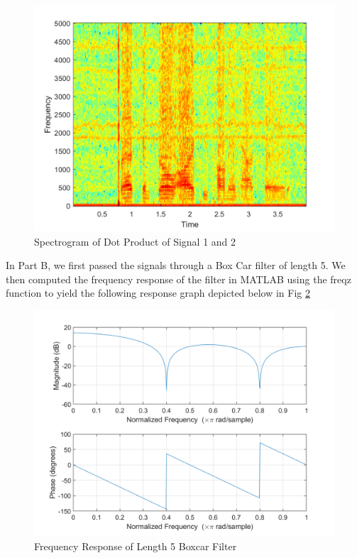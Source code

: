 \documentclass[10pt]{article}
\begin{document}
\begin{centering}
	\begin{figure} [H]
		\centering
		\includegraphics[scale=0.22]{images/multiplyspecgram.png}
		\caption{Spectrogram of Dot Product of Signal 1 and 2}
		\label{fig:multiply}
	\end{figure}
\end{centering}


In Part B, we first passed the signals through a Box Car filter of length 5. We then computed the frequency response of the filter in MATLAB using the freqz function to yield the following response graph depicted below in Fig \ref{fig:Boxcar5}

\begin{centering}
	\begin{figure} [H]
		\centering
		\includegraphics[scale=0.22]{images/73bss1.png}
		\caption{Frequency Response of Length 5 Boxcar Filter}
		\label{fig:Boxcar5}
	\end{figure}
\end{centering}
\end{document}
